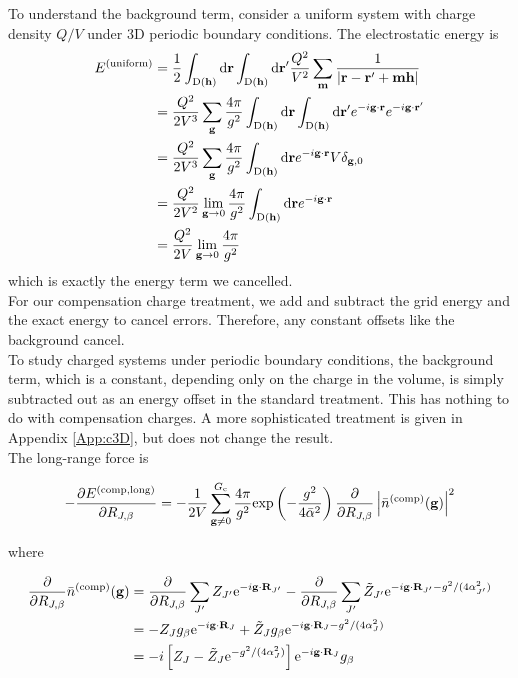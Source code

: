 \documentclass[paper=a4, fontsize=11pt]{article} %
\numberwithin{equation}{section} %
\numberwithin{figure}{section} %
\numberwithin{table}{section} %
\newcommand{\p}{\partial}
\newcommand{\bh}{{\bf{h}}}
\newcommand{\bm}{{\bf{m}}}
\newcommand{\bg}{{\bf{g}}}
\newcommand{\br}{{\bf{r}}}
\newcommand{\bR}{{\bf{R}}}
\newcommand{\rexp}{{\mathrm{exp}}}
\newcommand{\re}{{\mathrm{e}}}
\newcommand{\rlong}{{\mathrm{long}}}
\newcommand{\rd}{{\mathrm{d}}}
\newcommand{\rD}{{\mathrm{D}}}
\newcommand{\rcomp}{{\mathrm{comp}}}
\newcommand{\ibgR}{i\bg\cdot\bR}
\newcommand{\al}{{\alpha}}
\newcommand{\RJb}{{R_{J,\beta}}}
\newcommand{\Gc}{{G_{\mathrm{c}}}}
\newcommand{\bal}{{\bar{\alpha}}}
\begin{document}
To understand the background term, consider a uniform system with charge density $Q/V$ under 3D periodic boundary conditions. The electrostatic energy is
\begin{equation}
\begin{split}
E^{(\mathrm{uniform})}
&= \frac{1}{2} \int_{\rD(\bh)} \rd \br \int_{\rD(\bh)} \rd \br' \frac{Q^2}{V^2} \sum_{\bm} \frac{1}{|\br - \br' + \bm\bh|}\\
&= \frac{Q^2}{2V^3} \sum_{\bg} \frac{4\pi}{g^2}\int_{\rD(\bh)} \rd \br \int_{\rD(\bh)} \rd \br' e^{-i\bg\cdot \br} e^{-i\bg\cdot \br'}\\
&= \frac{Q^2}{2V^3} \sum_{\bg} \frac{4\pi}{g^2}\int_{\rD(\bh)}\rd \br e^{-i\bg\cdot \br} V \delta_{\bg,0}\\
&= \frac{Q^2}{2V^2} \lim_{\bg \rightarrow 0} \frac{4\pi}{g^2}\int_{\rD(\bh)}\rd \br e^{-i\bg\cdot \br}\\
&= \frac{Q^2}{2V} \lim_{\bg \rightarrow 0} \frac{4\pi}{g^2}
\end{split}
\end{equation}
which is exactly the energy term we cancelled.\\

For our compensation charge treatment, we add and subtract the grid energy and the exact energy to cancel errors. Therefore, any constant offsets like the background cancel. \\

To study charged systems under periodic boundary conditions, the background term, which is a constant, depending only on the charge in the volume, is simply subtracted out as an energy offset in the standard treatment. This has nothing to do with compensation charges. A more sophisticated treatment is given in Appendix \ref{App:c3D}, but does not change the result.\\

The long-range force is

\begin{equation}
\begin{split}
-\frac{\p E^{(\rcomp,\rlong)}}{\p \RJb}
&= -\frac{1}{2V} \sum_{\bg \neq 0}^{\Gc} \frac{4\pi}{g^2} \rexp\left(-\frac{g^2}{4\bal^2}\right) \frac{\p}{\p \RJb}\left|\bar n ^{(\rcomp)}(\bg)\right|^2 \\
\end{split}
\end{equation}

where

\begin{equation}
\begin{split}
\frac{\p}{\p \RJb} \bar n ^{(\rcomp)}(\bg)
&= \frac{\p}{\p \RJb} \sum_{J'} Z_{J'} \re^{-\ibgR_{J'}} -  \frac{\p}{\p \RJb} \sum_{J'} \tilde Z_{J'} \re^{-\ibgR_{J'} - g^2/(4\al_{J'}^2)}\\
&= -Z_J g_{\beta} \re^{-\ibgR_{J}} + \tilde Z_J g_{\beta} \re^{-\ibgR_{J}- g^2/(4\al_{J}^2)} \\
&= -i\left[Z_J - \tilde Z_J\re^{- g^2/(4\al_{J}^2)}\right]\re^{-\ibgR_{J}}g_{\beta}
\end{split}
\end{equation}
\end{document}
